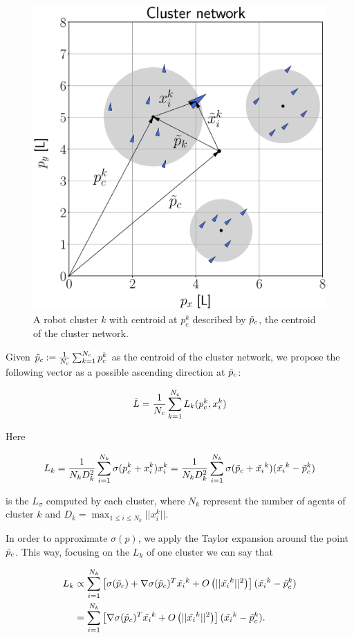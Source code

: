 \newpage

\begin{figure}[!h]
    \centering
    \includegraphics[trim={0 0 0 1.0cm}, clip, width=0.6\columnwidth]{./fig/pctilde.eps}
    \caption{A robot cluster $k$ with centroid at $p_c^k$ described by $\Tilde p_c$, the centroid of the cluster network.}
    \label{fig: pctilde}
\end{figure}

Given $\Tilde p_c := \frac{1}{N_c}\sum_{k=1}^{N_c}p_c^k$ as the centroid of the cluster network, we propose the following vector as a possible ascending direction at $\Tilde p_c$:

\begin{equation} \label{eq: L_tilde}
    \Tilde{L} = \frac{1}{N_c}\sum^{N_c}_{k=1}L_k(p_c^k, x_i^k)
\end{equation}

Here

\begin{equation}
    L_k = \frac{1}{N_k D_k^2}\sum^{N_k}_{i=1}\sigma(p_c^k + x_i^k)x_i^k = \frac{1}{N_k D_k^2}\sum^{N_k}_{i=1}\sigma(\Tilde p_c + \Tilde{x_i}^k)(\Tilde{x_i}^k - \Tilde p_c^k)
\end{equation}
 
is the $L_\sigma$ computed by each cluster, where $N_k$ represent the number of agents of cluster $k$ and $D_k = \operatorname{max}_{1\leq i\leq N_k}{||x_i^k||}$.

In order to approximate $\sigma(p)$, we apply the Taylor expansion around the point $\Tilde p_c$. This way, focusing on the $L_k$ of one cluster we can say that

\begin{align}\label{eq: l_k}
L_k & \propto \sum^{N_k}_{i=1} \left[ \sigma(\Tilde p_c) + \nabla\sigma(\Tilde p_c)^T\Tilde{x_i}^k + O\left(||\Tilde{x_i}^k||^2\right)\right] 
      (\Tilde{x_i}^k - \Tilde p_c^k) \nonumber\\
    & = \sum^{N_k}_{i=1} \left[\nabla\sigma(\Tilde p_c)^T\Tilde{x_i}^k + O\left(||\Tilde{x_i}^k||^2\right)\right] 
      (\Tilde{x_i}^k - \Tilde p_c^k).
\end{align}
\newpage

